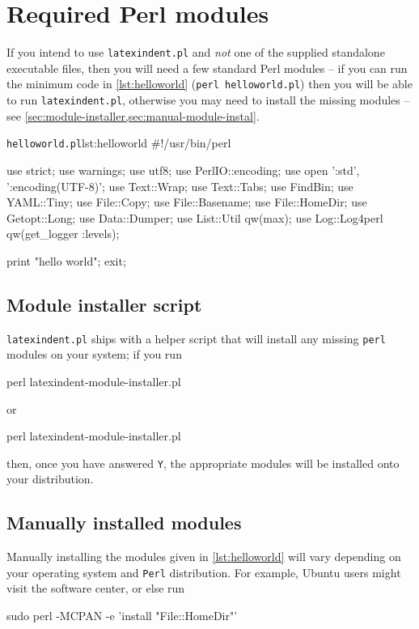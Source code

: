 \appendix
	\section{Required Perl modules}
	 \label{sec:requiredmodules}
	 If you intend to use \texttt{latexindent.pl} and \emph{not} one of the supplied standalone executable files, then you will need a few standard Perl modules -- if you can run the minimum code in \cref{lst:helloworld} (\texttt{perl helloworld.pl}) then you will be able to run \texttt{latexindent.pl}, otherwise you may need to install the missing modules -- see \cref{sec:module-installer,sec:manual-module-instal}.

	 \begin{cmhlistings}[style=tcblatex,language=Perl]{\texttt{helloworld.pl}}{lst:helloworld}
#!/usr/bin/perl

use strict;
use warnings;
use utf8;
use PerlIO::encoding;
use open ':std', ':encoding(UTF-8)';
use Text::Wrap;
use Text::Tabs;
use FindBin;
use YAML::Tiny;
use File::Copy;
use File::Basename;
use File::HomeDir;
use Getopt::Long;
use Data::Dumper;
use List::Util qw(max);
use Log::Log4perl qw(get_logger :levels);

print "hello world";
exit;
\end{cmhlistings}

	\subsection{Module installer script}
		\label{sec:module-installer}
		\texttt{latexindent.pl} ships with a helper script that will install any missing \texttt{perl} modules on your system; if you run \begin{commandshell}
perl latexindent-module-installer.pl
     \end{commandshell} or \begin{dosprompt}
perl latexindent-module-installer.pl
 \end{dosprompt} then, once you have answered \texttt{Y}, the appropriate modules will be installed onto your distribution.

	\subsection{Manually installed modules}
		\label{sec:manual-module-instal}
		Manually installing the modules given in \cref{lst:helloworld} will vary depending on your operating system and \texttt{Perl} distribution.
		For example, Ubuntu users might visit the software center, or else run \begin{commandshell}
sudo perl -MCPAN -e 'install "File::HomeDir"'
 \end{commandshell} 

